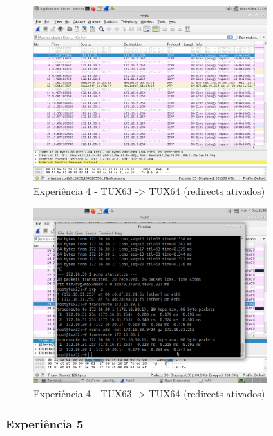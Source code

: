 \documentclass[11pt,a4paper]{article}
\begin{document}
\begin{figure}[H]
    \centering
    \includegraphics[width=0.8\textwidth]{images/experiencia4-ping3-Router2.png}
    \caption{Experiência 4 - TUX63 -> TUX64 (redirects ativados)}
\end{figure}

\begin{figure}[H]
    \centering
    \includegraphics[width=0.8\textwidth]{images/experiencia4-traceroutes.png}
    \caption{Experiência 4 - TUX63 -> TUX64 (redirects ativados)}
\end{figure}

\subsubsection{Experiência 5}
\end{document}
